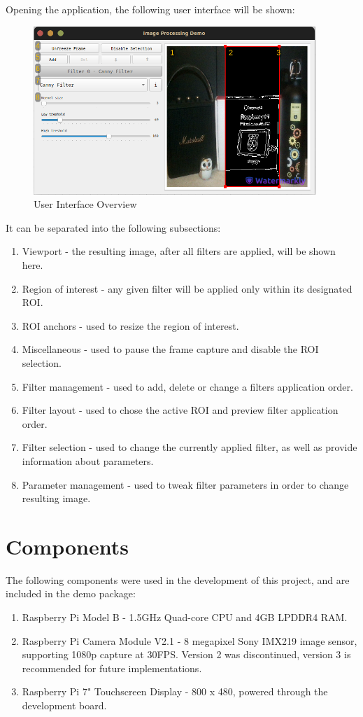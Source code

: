 Opening the application, the following user interface will be shown:
\begin{figure}[H]
	\includegraphics[width=0.95\textwidth, height=0.5\textwidth]{resources/Manual_Outline.jpg}
	\caption{User Interface Overview}
\end{figure}

It can be separated into the following subsections:
\begin{enumerate}
	\item Viewport - the resulting image, after all filters are applied, will be shown here.
	\item Region of interest - any given filter will be applied only within its designated ROI.
	\item ROI anchors - used to resize the region of interest.
	\item Miscellaneous - used to pause the frame capture and disable the ROI selection.
	\item Filter management - used to add, delete or change a filters application order.
	\item Filter layout - used to chose the active ROI and preview filter application order.
	\item Filter selection - used to change the currently applied filter, as well as provide
	      information about parameters.
	\item Parameter management - used to tweak filter parameters in order to change resulting image.
\end{enumerate}

\pagebreak
\section{Components}

The following components were used in the development of this project, and are included in the demo package:
\begin{enumerate}
	\item Raspberry Pi Model B - 1.5GHz Quad-core CPU and 4GB LPDDR4 RAM.
	\item Raspberry Pi Camera Module V2.1 - 8 megapixel Sony IMX219 image sensor, supporting 1080p capture at 30FPS.
	      Version 2 was discontinued, version 3 is recommended for future implementations.
	\item Raspberry Pi 7" Touchscreen Display - 800 x 480, powered through the development board.
\end{enumerate}

